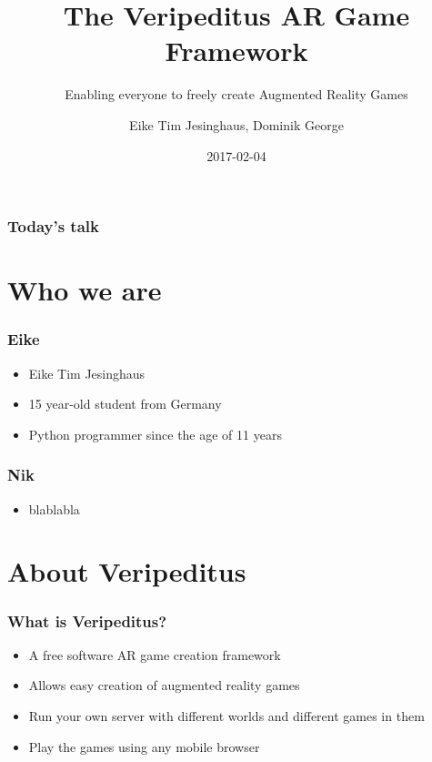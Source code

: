 \documentclass[aspectratio=43]{beamer}
\title{The Veripeditus AR Game Framework}
\subtitle{Enabling everyone to freely create Augmented Reality Games}
\author{Eike Tim Jesinghaus, Dominik George}
\date{2017-02-04}
\institute{FOSDEM 2017}
\begin{document}
 \begin{frame}
  \titlepage
 \end{frame}

 \begin{frame}
  \frametitle{Today's talk}
  \tableofcontents
 \end{frame}


 \section{Who we are}

 \begin{frame}
  \frametitle{Eike}

  \begin{itemize}
   \item{Eike Tim Jesinghaus}
   \item{15 year-old student from Germany}
   \item{Python programmer since the age of 11 years}
  \end{itemize}
 \end{frame}


 \begin{frame}
  \frametitle{Nik}

  \begin{itemize}
   \item{blablabla}
  \end{itemize}
 \end{frame}

 \section{About Veripeditus}

 \begin{frame}
  \frametitle{What is Veripeditus?}

  \begin{itemize}
   \item{A free software AR game creation framework}
   \item{Allows easy creation of augmented reality games}
   \item{Run your own server with different worlds and different games in them}
   \item{Play the games using any mobile browser}
  \end{itemize}
 \end{frame}
\end{document}
